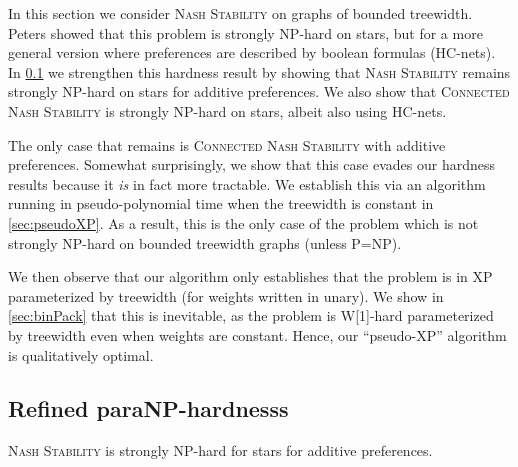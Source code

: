 \documentclass[letterpaper,USenglish,cleveref, autoref, thm-restate]{lipics-v2021}
\begin{document}
In this section we consider \textsc{Nash Stability} on graphs of bounded
treewidth. Peters \cite{Peters16a} showed that this problem is strongly NP-hard
on stars, but for a more general version where preferences are described by
boolean formulas (HC-nets). In \cref{sec:paraNP} we strengthen this hardness
result by showing that \textsc{Nash Stability} remains strongly NP-hard on
stars for additive preferences. We also show that \textsc{Connected Nash
Stability} is strongly NP-hard on stars, albeit also using HC-nets.

The only case that remains is \textsc{Connected Nash Stability} with additive
preferences. Somewhat surprisingly, we show that this case evades our hardness
results because it \emph{is} in fact more tractable.  We establish this via an
algorithm running in pseudo-polynomial time when the treewidth is constant in
\cref{sec:pseudoXP}. As a result, this is the only case of the problem which is
not strongly NP-hard on bounded treewidth graphs (unless P=NP).

We then observe that our algorithm only establishes that the problem is in XP
parameterized by treewidth (for weights written in unary). We show in
\cref{sec:binPack} that this is inevitable, as the problem is W[1]-hard
parameterized by treewidth even when weights are constant.  Hence, our
``pseudo-XP'' algorithm  is qualitatively optimal.


\subsection{Refined paraNP-hardnesss}\label{sec:paraNP}


\begin{theorem}\label{thm:paraNP} \textsc{Nash Stability} is strongly NP-hard
for stars for additive preferences.  \end{theorem}
\end{document}
